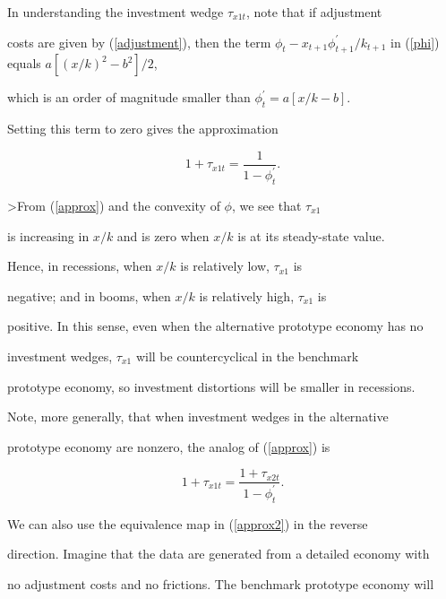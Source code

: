 \documentclass[fleqn,leqno,11pt]{article}
\begin{document}
In understanding the investment wedge $\tau _{x1t}$, note that if adjustment

costs are given by (\ref{adjustment}), then the term $\phi _{t}-x_{t+1}\phi

_{t+1}^{\prime }/k_{t+1}$ in (\ref{phi}) equals $a[(x/k)^{2}-b^{2}]/2$,

which is an order of magnitude smaller than $\phi _{t}^{\prime }=a[x/k-b].$

Setting this term to zero gives the approximation 

\begin{equation}

1+\tau _{x1t}=\frac{1}{1-\phi _{t}^{\prime }}.  \label{approx}

\end{equation}%

>From (\ref{approx}) and the convexity of $\phi $, we see that $\tau _{x1}$

is increasing in $x/k$ and is zero when $x/k$ is at its steady-state value.

Hence, in recessions, when $x/k$ is relatively low, $\tau _{x1}$ is

negative; and in booms, when $x/k$ is relatively high, $\tau _{x1}$ is

positive. In this sense, even when the alternative prototype economy has no

investment wedges, $\tau _{x1}$ will be countercyclical in the benchmark

prototype economy, so investment distortions will be smaller in recessions.



Note, more generally, that when investment wedges in the alternative

prototype economy are nonzero, the analog of (\ref{approx}) is 

\begin{equation}

1+\tau _{x1t}=\frac{1+\tau _{x2t}}{1-\phi _{t}^{\prime }}.  \label{approx2}

\end{equation}



We can also use the equivalence map in (\ref{approx2}) in the reverse

direction. Imagine that the data are generated from a detailed economy with

no adjustment costs and no frictions. The benchmark prototype economy will
\end{document}
